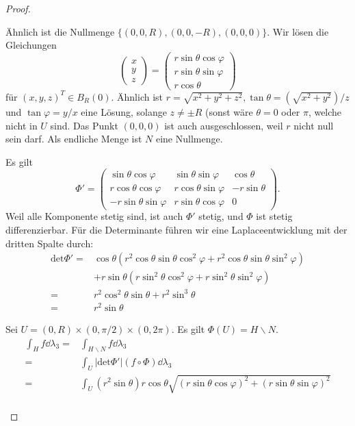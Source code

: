\begin{proof}
	\begin{parts}
	\item Ähnlich ist die Nullmenge $\{(0,0,R),(0,0,-R),(0,0,0)\} $. Wir lösen die Gleichungen
		\[
			\begin{pmatrix} x \\ y \\ z \end{pmatrix} =\begin{pmatrix} r\sin\theta\cos\varphi \\ r\sin\theta\sin\varphi \\ r\cos\theta \end{pmatrix} 
		\]
		f\"{u}r $(x,y,z)^T\in B_R(0)$. Ähnlich ist $r=\sqrt{x^2+y^2+z^2}, \tan\theta = (\sqrt{x^2+y^2} ) / z$ und $\tan\varphi=y / x$ eine Lösung, solange $z\neq\pm R$ (sonst wäre $\theta=0$ oder $\pi$, welche nicht in $U$ sind. Das Punkt $(0,0,0)$ ist auch ausgeschlossen, weil $r$ nicht null sein darf. Als endliche Menge ist $N$ eine Nullmenge.
	\item Es gilt
		\[
			\Phi'=\begin{pmatrix} \sin\theta\cos\varphi & \sin\theta\sin\varphi & \cos\theta \\ r\cos\theta\cos\varphi & r\cos\theta\sin\varphi & -r\sin\theta \\ -r\sin\theta\sin\varphi & r\sin\theta\cos\varphi & 0 \end{pmatrix} 
		.\] 
		Weil alle Komponente stetig sind, ist auch $\Phi'$ stetig, und $\Phi$ ist stetig differenzierbar. F\"{u}r die Determinante f\"{u}hren wir eine Laplaceentwicklung mit der dritten Spalte durch:
		\begin{align*}
			\text{det}\Phi'=&\cos\theta(r^2\cos\theta\sin\theta\cos^2\varphi+r^2\cos\theta\sin\theta\sin^2\varphi)\\
					&+r\sin\theta(r\sin^2\theta\cos^2\varphi+r\sin^2\theta\sin^2\varphi)\\
			=&r^2\cos^2\theta\sin\theta+r^2\sin^3\theta\\
			=&r^2\sin\theta
		\end{align*}
	\item Sei $U=(0,R)\times (0,\pi / 2)\times (0,2\pi)$. Es gilt $\Phi(U)=H\backslash N$.
		 \begin{align*}
			 \int_H f\dd{\lambda_3}=&\int_{H\backslash N}f\dd{\lambda_3}\\
			 =&\int_U |\text{det}\Phi'|(f\circ \Phi)\dd{\lambda_3}\\
			 =&\int_U (r^2\sin\theta)r\cos\theta\sqrt{(r\sin\theta\cos\varphi)^2+(r\sin\theta\sin\varphi)^2} \\

\end{align*}
\end{parts}
\end{proof}
